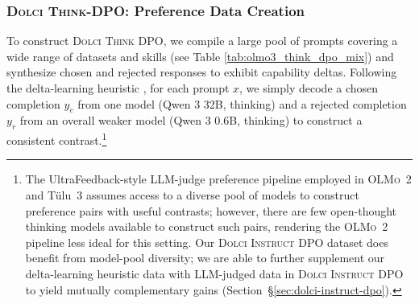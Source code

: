 \documentclass[table]{ai2style/ai2}
\newcommand{\oldOlmo}{OLMo\xspace}
\newcommand{\tulu}{T\"ulu~3\xspace}
\newcommand{\olmotoo}{\textsc{\oldOlmo~2}\xspace}
\newcommand{\dolcithink}{\textsc{Dolci Think}\xspace}
\newcommand{\dolcithinkdpo}{\textsc{Dolci Think DPO}\xspace}
\newcommand{\dolciinstructdpo}{\textsc{Dolci Instruct DPO}\xspace}
\begin{document}
\subsubsection{\dolcithink-DPO: Preference Data Creation}
\label{sec:dpo_think_data}
To construct \dolcithinkdpo, we compile a large pool of prompts covering a wide range of datasets and skills (see Table \ref{tab:olmo3_think_dpo_mix}) and synthesize chosen and rejected responses to exhibit capability deltas.
Following the delta-learning heuristic \citep{geng2025delta}, for each prompt $x$, we simply decode a chosen completion $y_c$ from one model (Qwen 3 32B, thinking) and a rejected completion $y_r$ from an overall weaker model (Qwen 3 0.6B, thinking) to construct a consistent contrast.\footnote{The UltraFeedback-style LLM-judge preference pipeline employed in \olmotoo and \tulu assumes access to a diverse pool of models to construct preference pairs with useful contrasts; however, there are few open-thought thinking models available to construct such pairs, rendering the \olmotoo pipeline less ideal for this setting. Our \dolciinstructdpo dataset does benefit from model-pool diversity; we are able to further supplement our delta-learning heuristic data with LLM-judged data in \dolciinstructdpo to yield mutually complementary gains (Section~\S\ref{sec:dolci-instruct-dpo}).}
\end{document}
